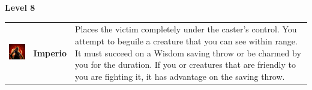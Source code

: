 \textbf{Level 8} 
\begin{tabular}{ m{4cm}m{3cm}m{6cm} } 
	\includegraphics[width=4cm]{../Pictures/Gameplay/Spells/Icon/spell_icon.png} & \textbf{Imperio} & Places the victim completely under the caster's control. You attempt to beguile a creature that you can see within range. It must succeed on a Wisdom saving throw or be charmed by you for the duration. If you or creatures that are friendly to you are fighting it, it has advantage on the saving throw. \\ 
\end{tabular}

